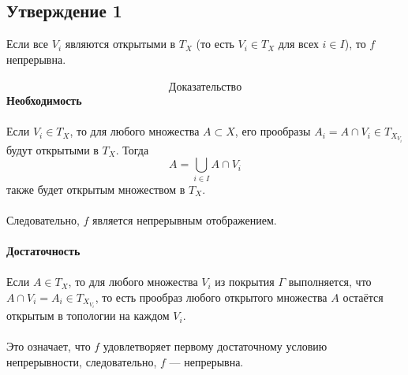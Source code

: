 \documentclass{article}
\begin{document}
        \subsection*{Утверждение 1}
        Если все \( V_i \) являются открытыми в \( T_X \) (то есть \( V_i \in T_X \) для всех \( i \in I \)), то \( f \) непрерывна.\\ \\
        \[
            \textbf{Доказательство} 
        \]
        \textbf{Необходимость} \\ \\
        Если \( V_i \in T_X \), то для любого множества \( A \subset X \), его прообразы \( A_i = A \cap V_i \in T_{X_{V_i}} \) будут открытыми в \( T_X \). Тогда
        \[
        A = \bigcup_{i \in I} A \cap V_i
        \]
        также будет открытым множеством в \( T_X \).\\ \\ Следовательно, \( f \) является непрерывным отображением. \\ \\
        \textbf{Достаточность} \\ \\
        Если \( A \in T_X \), то для любого множества \( V_i \) из покрытия \( \Gamma \) выполняется, что \( A \cap V_i = A_i \in T_{X_{V_i}} \), то есть прообраз любого открытого множества \( A \) остаётся открытым в топологии на каждом \( V_i \).\\ \\ Это означает, что \( f \) удовлетворяет первому достаточному условию непрерывности, следовательно, \( f \) — непрерывна.
\end{document}
